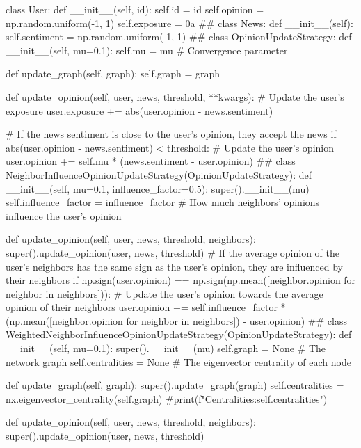 \begin{codigo}[caption={Simulando redes sociais segundo a modelagem baseada em agentes}, label={codigo:mba}, language=Python, breaklines=true]
  class User:
  def __init__(self, id):
      self.id = id
      self.opinion = np.random.uniform(-1, 1)
      self.exposure = 0a
##
class News:
  def __init__(self):
      self.sentiment = np.random.uniform(-1, 1)
##
class OpinionUpdateStrategy:
  def __init__(self, mu=0.1):
      self.mu = mu  # Convergence parameter

  def update_graph(self, graph):
      self.graph = graph

  def update_opinion(self, user, news, threshold, **kwargs):
      # Update the user's exposure
      user.exposure += abs(user.opinion - news.sentiment)

      # If the news sentiment is close to the user's opinion, they accept the news
      if abs(user.opinion - news.sentiment) < threshold:
          # Update the user's opinion
          user.opinion += self.mu * (news.sentiment - user.opinion)
##
class NeighborInfluenceOpinionUpdateStrategy(OpinionUpdateStrategy):
  def __init__(self, mu=0.1, influence_factor=0.5):
      super().__init__(mu)
      self.influence_factor = influence_factor  # How much neighbors' opinions influence the user's opinion

  def update_opinion(self, user, news, threshold, neighbors):
      super().update_opinion(user, news, threshold)
      # If the average opinion of the user's neighbors has the same sign as the user's opinion, they are influenced by their neighbors
      if np.sign(user.opinion) == np.sign(np.mean([neighbor.opinion for neighbor in neighbors])):
          # Update the user's opinion towards the average opinion of their neighbors
          user.opinion += self.influence_factor * (np.mean([neighbor.opinion for neighbor in neighbors]) - user.opinion)
##
class WeightedNeighborInfluenceOpinionUpdateStrategy(OpinionUpdateStrategy):
  def __init__(self, mu=0.1):
      super().__init__(mu)
      self.graph = None  # The network graph
      self.centralities = None  # The eigenvector centrality of each node

  def update_graph(self, graph):
      super().update_graph(graph)
      self.centralities = nx.eigenvector_centrality(self.graph)
      #print(f"Centralities:{self.centralities}")

  def update_opinion(self, user, news, threshold, neighbors):
    super().update_opinion(user, news, threshold)


\end{codigo}

